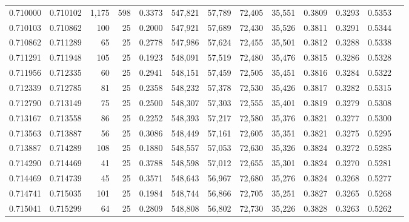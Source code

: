 \begin{tabular}{rrrrrrrrrrrrr}
0.710000 & 0.710102 & 1,175 & 598 &                                     0.3373 & 547,821 &  57,789 &  72,405 &  35,551 & 0.3809 & 0.3293 & 0.5353 \\
0.710103 & 0.710862 &   100 &  25 &                                     0.2000 & 547,921 &  57,689 &  72,430 &  35,526 & 0.3811 & 0.3291 & 0.5344 \\
0.710862 & 0.711289 &    65 &  25 &                                     0.2778 & 547,986 &  57,624 &  72,455 &  35,501 & 0.3812 & 0.3288 & 0.5338 \\
0.711291 & 0.711948 &   105 &  25 &                                     0.1923 & 548,091 &  57,519 &  72,480 &  35,476 & 0.3815 & 0.3286 & 0.5328 \\
0.711956 & 0.712335 &    60 &  25 &                                     0.2941 & 548,151 &  57,459 &  72,505 &  35,451 & 0.3816 & 0.3284 & 0.5322 \\
0.712339 & 0.712785 &    81 &  25 &                                     0.2358 & 548,232 &  57,378 &  72,530 &  35,426 & 0.3817 & 0.3282 & 0.5315 \\
0.712790 & 0.713149 &    75 &  25 &                                     0.2500 & 548,307 &  57,303 &  72,555 &  35,401 & 0.3819 & 0.3279 & 0.5308 \\
0.713167 & 0.713558 &    86 &  25 &                                     0.2252 & 548,393 &  57,217 &  72,580 &  35,376 & 0.3821 & 0.3277 & 0.5300 \\
0.713563 & 0.713887 &    56 &  25 &                                     0.3086 & 548,449 &  57,161 &  72,605 &  35,351 & 0.3821 & 0.3275 & 0.5295 \\
0.713887 & 0.714289 &   108 &  25 &                                     0.1880 & 548,557 &  57,053 &  72,630 &  35,326 & 0.3824 & 0.3272 & 0.5285 \\
0.714290 & 0.714469 &    41 &  25 &                                     0.3788 & 548,598 &  57,012 &  72,655 &  35,301 & 0.3824 & 0.3270 & 0.5281 \\
0.714469 & 0.714739 &    45 &  25 &                                     0.3571 & 548,643 &  56,967 &  72,680 &  35,276 & 0.3824 & 0.3268 & 0.5277 \\
0.714741 & 0.715035 &   101 &  25 &                                     0.1984 & 548,744 &  56,866 &  72,705 &  35,251 & 0.3827 & 0.3265 & 0.5268 \\
0.715041 & 0.715299 &    64 &  25 &                                     0.2809 & 548,808 &  56,802 &  72,730 &  35,226 & 0.3828 & 0.3263 & 0.5262 \\

\end{tabular}
